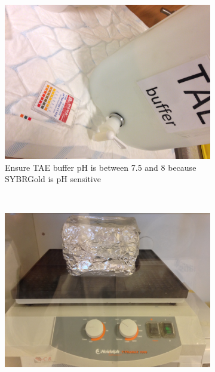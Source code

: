 \begin{figure}[H] %
    \centering
    \caption{SYBR\cR Gold Staining considerations and results}
    \label{fig:20180315_sybr_gold_staining}
    \begin{subfigure}[b]{0.37\textwidth}
        \includegraphics[width=\textwidth]{graphics/pic/20180315_TAE_pH_check.JPG}
        \caption{Ensure TAE buffer pH is between 7.5 and 8 because SYBR\cR Gold is pH sensitive}
        \label{sfig:20180315_TAE_pH_check}
    \end{subfigure}
    ~ 
    \begin{subfigure}[b]{0.37\textwidth}
        \includegraphics[width=\textwidth]{graphics/pic/20180315_sybr_gold_incubation.JPG}

\end{subfigure}
\end{figure}
